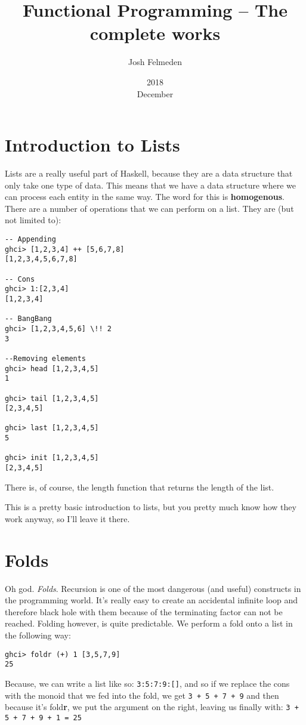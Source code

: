 \documentclass[11pt,a4paper,titlepage,dvipsnames,cmyk]{scrartcl}
\title{Functional Programming -- The complete works}
\author{Josh Felmeden}
\date{2018\\ December}
\begin{document}
\maketitle
\tableofcontents
\newpage

\section{Introduction to Lists}%
\label{sec:lists1}
Lists are a really useful part of Haskell, because they are a data structure
that only take one type of data. This means that we have a data structure where
we can process each entity in the same way. The word for this is
\textbf{homogenous}. There are a number of operations that we can perform on a
list. They are (but not limited to):
\begin{lstlisting}[style=B]
-- Appending
ghci> [1,2,3,4] ++ [5,6,7,8]
[1,2,3,4,5,6,7,8]

-- Cons
ghci> 1:[2,3,4]
[1,2,3,4]

-- BangBang
ghci> [1,2,3,4,5,6] \!! 2
3

--Removing elements
ghci> head [1,2,3,4,5]
1

ghci> tail [1,2,3,4,5]
[2,3,4,5]

ghci> last [1,2,3,4,5]
5

ghci> init [1,2,3,4,5]
[2,3,4,5]
\end{lstlisting}
There is, of course, the length function that returns the length of the list.

This is a pretty basic introduction to lists, but you pretty much know how they
work anyway, so I'll leave it there.

\section{Folds}%
\label{sec:Folds}
Oh god. \textit{Folds}. Recursion is one of the most dangerous (and useful)
constructs in the programming world. It's really easy to create an accidental
infinite loop and therefore black hole with them because of the terminating
factor can not be reached. Folding however, is quite predictable. We perform a
fold onto a list in the following way:
\begin{lstlisting}[style=B]
ghci> foldr (+) 1 [3,5,7,9]
25
\end{lstlisting}
Because, we can write a list like so: \lstinline|3:5:7:9:[]|, and so if we replace the
cons with the monoid that we fed into the fold, we get \lstinline|3 + 5 + 7 + 9|
and then because it's fold\textbf{r}, we put the argument on the right, leaving
us finally with: \lstinline|3 + 5 + 7 + 9 + 1 = 25|
\end{document}
